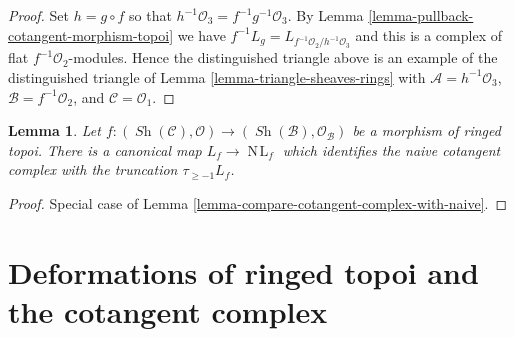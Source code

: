 \documentclass{stacks-project}
\theoremstyle{plain}
\newtheorem{lemma}[subsection]{Lemma}
\theoremstyle{definition}
\theoremstyle{remark}
\numberwithin{equation}{subsection}
\def\Sh{\mathop{\mathit{Sh}}\nolimits}
\def\NL{\mathop{N\!L}\nolimits}
\begin{document}
\begin{proof}
Set $h = g \circ f$ so that $h^{-1}\mathcal{O}_3 = f^{-1}g^{-1}\mathcal{O}_3$.
By Lemma \ref{lemma-pullback-cotangent-morphism-topoi} we have
$f^{-1}L_g = L_{f^{-1}\mathcal{O}_2/h^{-1}\mathcal{O}_3}$
and this is a complex of flat $f^{-1}\mathcal{O}_2$-modules.
Hence the distinguished triangle above is an example of the
distinguished triangle of
Lemma \ref{lemma-triangle-sheaves-rings}
with $\mathcal{A} = h^{-1}\mathcal{O}_3$, $\mathcal{B} = f^{-1}\mathcal{O}_2$,
and $\mathcal{C} = \mathcal{O}_1$.
\end{proof}

\begin{lemma}
\label{lemma-compare-cotangent-complex-with-naive-ringed-topoi}
Let $f : (\Sh(\mathcal{C}), \mathcal{O}) \to
(\Sh(\mathcal{B}), \mathcal{O}_\mathcal{B})$ be a morphism of
ringed topoi. There is a canonical map $L_f \to \NL_f$ which
identifies the naive cotangent complex with the truncation
$\tau_{\geq -1}L_f$.
\end{lemma}

\begin{proof}
Special case of Lemma \ref{lemma-compare-cotangent-complex-with-naive}.
\end{proof}








\section{Deformations of ringed topoi and the cotangent complex}
\label{section-deformations-ringed-topoi}
\end{document}
